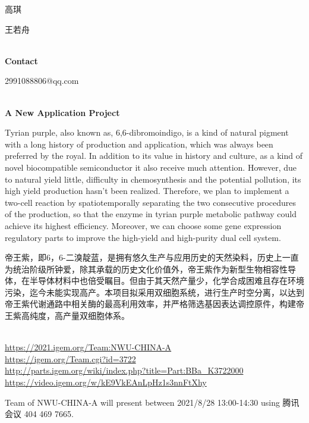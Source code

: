   高琪

  王若舟


\textbf{\\Contact}

  2991088806@qq.com


\textbf{\\A New Application Project\\}\begin{spacing}{1.5}

Tyrian purple, also known as, 6,6-dibromoindigo, is a kind of natural pigment with a long history of production and application, which was always been preferred by the royal. In addition to its value in history and culture, as a kind of novel biocompatible semiconductor it also receive much attention. However, due to natural yield little, difficulty in chemosynthesis and the potential pollution, its high yield production hasn’t been realized. Therefore, we plan to implement a two-cell reaction by spatiotemporally separating the two consecutive procedures of the production, so that the enzyme in tyrian purple metabolic pathway could achieve its highest efficiency. Moreover, we can choose some gene expression regulatory parts to improve the high-yield and high-purity dual cell system.

帝王紫，即6，6-二溴靛蓝，是拥有悠久生产与应用历史的天然染料，历史上一直为统治阶级所钟爱，除其承载的历史文化价值外，帝王紫作为新型生物相容性导体，在半导体材料中也倍受瞩目。但由于其天然产量少，化学合成困难且存在环境污染，迄今未能实现高产。本项目拟采用双细胞系统，进行生产时空分离，以达到帝王紫代谢通路中相关酶的最高利用效率，并严格筛选基因表达调控原件，构建帝王紫高纯度，高产量双细胞体系。\end{spacing}
\\

\url{https://2021.igem.org/Team:NWU-CHINA-A }\\
\url{https://igem.org/Team.cgi?id=3722 }\\
\url{http://parts.igem.org/wiki/index.php?title=Part:BBa_K3722000 }\\
\url{https://video.igem.org/w/kE9VkEAnLpHz1s3nnFtXhy }\\

\vfill{}









Team of NWU-CHINA-A will present between      2021/8/28 13:00-14:30   using 腾讯会议 404 469 7665.
\newpage


